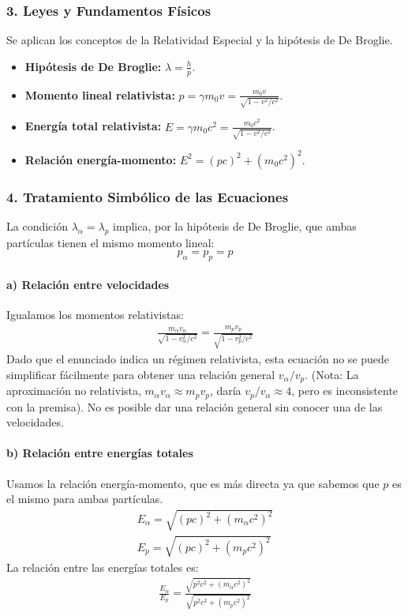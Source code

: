 \subsubsection*{3. Leyes y Fundamentos Físicos}
Se aplican los conceptos de la Relatividad Especial y la hipótesis de De Broglie.
\begin{itemize}
    \item \textbf{Hipótesis de De Broglie:} $\lambda = \frac{h}{p}$.
    \item \textbf{Momento lineal relativista:} $p = \gamma m_0 v = \frac{m_0 v}{\sqrt{1-v^2/c^2}}$.
    \item \textbf{Energía total relativista:} $E = \gamma m_0 c^2 = \frac{m_0 c^2}{\sqrt{1-v^2/c^2}}$.
    \item \textbf{Relación energía-momento:} $E^2 = (pc)^2 + (m_0c^2)^2$.
\end{itemize}

\subsubsection*{4. Tratamiento Simbólico de las Ecuaciones}
La condición $\lambda_\alpha = \lambda_p$ implica, por la hipótesis de De Broglie, que ambas partículas tienen el mismo momento lineal:
$$ p_\alpha = p_p = p $$

\paragraph*{a) Relación entre velocidades}
Igualamos los momentos relativistas:
\begin{gather}
    \frac{m_\alpha v_\alpha}{\sqrt{1-v_\alpha^2/c^2}} = \frac{m_p v_p}{\sqrt{1-v_p^2/c^2}}
\end{gather}
Dado que el enunciado indica un régimen relativista, esta ecuación no se puede simplificar fácilmente para obtener una relación general $v_\alpha/v_p$. (Nota: La aproximación no relativista, $m_\alpha v_\alpha \approx m_p v_p$, daría $v_p/v_\alpha \approx 4$, pero es inconsistente con la premisa). No es posible dar una relación general sin conocer una de las velocidades.

\paragraph*{b) Relación entre energías totales}
Usamos la relación energía-momento, que es más directa ya que sabemos que $p$ es el mismo para ambas partículas.
\begin{gather}
    E_\alpha = \sqrt{(pc)^2 + (m_\alpha c^2)^2} \\
    E_p = \sqrt{(pc)^2 + (m_p c^2)^2}
\end{gather}
La relación entre las energías totales es:
\begin{gather}
    \frac{E_\alpha}{E_p} = \frac{\sqrt{p^2c^2 + (m_\alpha c^2)^2}}{\sqrt{p^2c^2 + (m_p c^2)^2}}
\end{gather}

